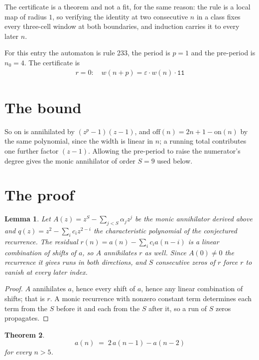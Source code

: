 \documentclass[11pt,a4paper]{article}
\theoremstyle{plain}
\newtheorem{theorem}{Theorem}
\newtheorem{lemma}[theorem]{Lemma}
\theoremstyle{definition}
\begin{document}
The certificate is a theorem and not a fit, for the same reason: the rule is a local map of
radius $1$, so verifying the identity at two consecutive $n$ in a class fixes every three-cell
window at both boundaries, and induction carries it to every later $n$.

For this entry the automaton is rule 233, the period is $p=1$ and the pre-period is $n_0=4$.
The certificate is
\begin{gather*}
r=0:\quad w(n+p) = \varepsilon \cdot w(n) \cdot \texttt{11}
\end{gather*}

\section{The bound}

So
$\mathrm{on}$ is annihilated by $(z^p-1)(z-1)$, and $\mathrm{off}(n)=2n+1-\mathrm{on}(n)$ by
the same polynomial, since the width is linear in $n$; a running total contributes one further
factor $(z-1)$. Allowing the pre-period to raise the numerator's degree gives the monic
annihilator of order $S=9$ used below.

\section{The proof}

\begin{lemma}\label{lem:crit}
Let $A(z)=z^S-\sum_{j<S}\alpha_jz^{j}$ be the monic annihilator derived above and
$q(z)=z^{2}-\sum_ic_iz^{2-i}$ the characteristic polynomial of the conjectured
recurrence. The residual $r(n)=a(n)-\sum_ic_ia(n-i)$ is a linear combination of shifts of $a$,
so $A$ annihilates $r$ as well. Since $A(0)\ne0$ the recurrence it gives runs in both
directions, and $S$ consecutive zeros of $r$ force $r$ to vanish at every later index.
\end{lemma}

\begin{proof}
$A$ annihilates $a$, hence every shift of $a$, hence any linear combination of shifts; that is
$r$. A monic recurrence with nonzero constant term determines each term from the $S$ before it
and each from the $S$ after it, so a run of $S$ zeros propagates.
\end{proof}

\begin{theorem}
\[
a(n)\;=\;2\,a(n-1) - a(n-2)
\]
for every $n>5$.
\end{theorem}
\end{document}
